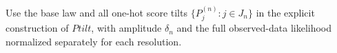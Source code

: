 Use the base law and all one-hot score tilts \(\{P_j^{(n)}:j\in J_n\}\) in the explicit construction of \(Ptilt\), with amplitude \(\delta_n\) and the full observed-data likelihood normalized separately for each resolution.